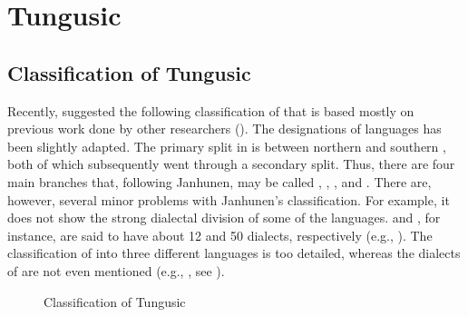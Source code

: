 \section{Tungusic}\label{sec:5.10}
\subsection{Classification of Tungusic}\label{sec:5.10.1}

Recently, \citet[16]{Janhunen2012b} suggested the following classification of  that is based mostly on previous work done by other researchers (\citealt{Ikegami1974,Lie1978,Doerfer1978a,Georg2004}). The designations of languages has been slightly adapted. The primary split in  is between northern and southern , both of which subsequently went through a secondary split. Thus, there are four main branches that, following Janhunen, may be called , , , and . There are, however, several minor problems with Janhunen’s classification. For example, it does not show the strong dialectal division of some of the languages.  and , for instance, are said to have about 12 and 50 dialects, respectively (e.g., \citealt{Malchukov1995,Atknine1997}). The classification of  into three different languages is too detailed, whereas the dialects of  are not even mentioned (e.g., \citealt{WhaleyLi2000}, see ).

\begin{figure}
\caption{Classification of Tungusic}
    \label{exfig:tungu:1}
    \small 
\end{figure}

